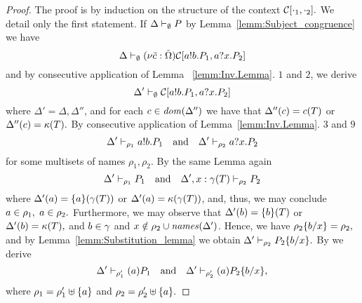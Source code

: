 \begin{proof}
The proof is by induction on the structure of the context $\mathcal{C}[\cdot_1, \cdot_2].$ We detail only the first statement. If $ \Delta\vdash_\emptyset P$ by Lemma~\ref{lemm:Subject_congruence} we have  
\[ \Delta\vdash_\emptyset (\nu \tilde{c}: \tilde{\Omega})\mathcal{C}[a!b.P_1, a?x.P_2]
\] 
and by consecutive application of Lemma ~\ref{lemm:Inv.Lemma}. $1$ and $2$, we derive 
\[
 \Delta'\vdash_\emptyset \mathcal{C}[a!b.P_1, a?x.P_2]
\]
where $\Delta'= \Delta, \Delta''$, and for each $c\in\mathit{dom}(\Delta'')$ we have that $\Delta''(c)=c(T)$ or $\Delta''(c)={\mathbf{\kappa}}(T).$ By consecutive application of Lemma~\ref{lemm:Inv.Lemma}. $3$ and $9$ 
\[
 \Delta'\vdash_{\rho_1} a!b.P_1 \quad \text{and} \quad  \Delta'\vdash_{\rho_2} a?x.P_2
\]
for some multisets of names $\rho_1, \rho_2.$ 
By the same Lemma again 
\[
 \Delta'\vdash_{\rho_1} P_1 \quad \text{and} \quad  \Delta', x:\gamma(T)\vdash_{\rho_2}P_2
\]
where $\Delta'(a)=\{a\}(\gamma(T))$ or $\Delta'(a)={\mathbf{\kappa}}(\gamma(T))$, and, thus, we may conclude $a\in\rho_1,$ $a\in\rho_2.$  Furthermore, we may observe that $\Delta'(b)=\{b\}(T)$ or $\Delta'(b)={\mathbf{\kappa}}(T),$ and $b\in\gamma$  and $x\notin\rho_2\cup\mathit{names}(\Delta')$. Hence, we have $\rho_2\{b/x\}=\rho_2,$ and by Lemma~\ref{lemm:Substitution_lemma} we obtain $\Delta'\vdash_{\rho_2}P_2\{b/x\}.$
By  we derive
\[
 \Delta'\vdash_{\rho_1'} (a) P_1 \quad \text{and} \quad  \Delta'\vdash_{\rho_2'} (a)P_2\{b/x\},
\]
where $\rho_1=\rho_1'\uplus\{a\}$ and $\rho_2=\rho_2'\uplus\{a\}.$


\end{proof}
